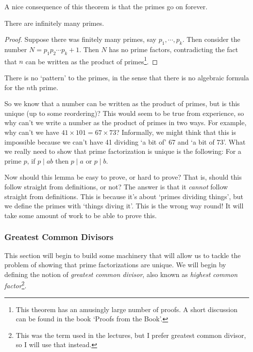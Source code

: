 A nice consequence of this theorem is that the primes go on forever.

\begin{theorem}[Euclid]
	There are infinitely many primes.
\end{theorem}
\begin{proof}
	Suppose there was finitely many primes, say $p_1, \cdots, p_k$. Then consider the number $N = p_1 p_2 \cdots p_k + 1$. Then $N$ has no prime factors, contradicting the fact that $n$ can be written as the product of primes\footnote{This theorem has an amusingly large number of proofs. A short discussion can be found in the book `Proofs from the Book'.}.
\end{proof}

\begin{remark}
	There is no `pattern' to the primes, in the sense that there is no algebraic formula for the $n$th prime. 
\end{remark}

So we know that a number can be written as the product of primes, but is this unique (up to some reordering)? This would seem to be true from experience, so why can't we write a number as the product of primes in two ways. For example, why can't we have $41 \times 101 = 67 \times 73$? Informally, we might think that this is impossible because we can't have 41 dividing `a bit of' 67 and `a bit of 73'. What we really need to show that prime factorization is unique is the following: For a prime $p$, if $p \mid ab$ then $p \mid a$ or $p \mid b$.

Now should this lemma be easy to prove, or hard to prove? That is, should this follow straight from definitions, or not? The answer is that it \emph{cannot} follow straight from definitions. This is because it's about `primes dividing things', but we define the primes with `things diving it'. This is the wrong way round! It will take some amount of work to be able to prove this.

\subsubsection{Greatest Common Divisors}

This section will begin to build some machinery that will allow us to tackle the problem of showing that prime factorizations are unique. We will begin by defining the notion of \emph{greatest common divisor}, also known as \emph{highest common factor}\footnote{This was the term used in the lectures, but I prefer greatest common divisor, so I will use that instead.}.

